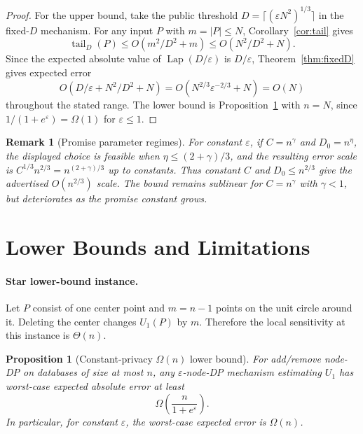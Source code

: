 \documentclass[11pt]{article}
\newtheorem{proposition}[theorem]{Proposition}
\newtheorem{remark}[theorem]{Remark}
\DeclareMathOperator{\Lap}{Lap}
\newcommand{\eps}{\varepsilon}
\newcommand{\tail}{\operatorname{tail}}
\begin{document}
\begin{proof}
For the upper bound, take the public threshold \(D=\lceil(\eps N^2)^{1/3}\rceil\) in the fixed-\(D\) mechanism. For any input \(P\) with \(m=|P|\le N\), Corollary~\ref{cor:tail} gives
\[
\tail_D(P)\le O(m^2/D^2+m)\le O(N^2/D^2+N).
\]
Since the expected absolute value of \(\Lap(D/\eps)\) is \(D/\eps\), Theorem~\ref{thm:fixedD} gives expected error
\[
O(D/\eps+N^2/D^2+N)=O(N^{2/3}\eps^{-2/3}+N)=O(N)
\]
throughout the stated range. The lower bound is Proposition~\ref{prop:lower} with \(n=N\), since \(1/(1+e^\eps)=\Omega(1)\) for \(\eps\le1\).
\end{proof}

\begin{remark}[Promise parameter regimes]
For constant \(\eps\), if \(C=n^\gamma\) and \(D_0=n^\eta\), the displayed choice is feasible when \(\eta\le (2+\gamma)/3\), and the resulting error scale is \(C^{1/3}n^{2/3}=n^{(2+\gamma)/3}\) up to constants. Thus constant \(C\) and \(D_0\le n^{2/3}\) give the advertised \(O(n^{2/3})\) scale. The bound remains sublinear for \(C=n^{\gamma}\) with \(\gamma<1\), but deteriorates as the promise constant grows.
\end{remark}

\section{Lower Bounds and Limitations}
\label{sec:lower}

\paragraph{Star lower-bound instance.}
Let \(P\) consist of one center point and \(m=n-1\) points on the unit circle around it. Deleting the center changes \(U_1(P)\) by \(m\). Therefore the local sensitivity at this instance is \(\Theta(n)\).

\begin{proposition}[Constant-privacy \(\Omega(n)\) lower bound]
\label{prop:lower}
For add/remove node-DP on databases of size at most \(n\), any \(\eps\)-node-DP mechanism estimating \(U_1\) has worst-case expected absolute error at least
\[
\Omega\!\left(\frac{n}{1+e^\eps}\right).
\]
In particular, for constant \(\eps\), the worst-case expected error is \(\Omega(n)\).
\end{proposition}
\end{document}
